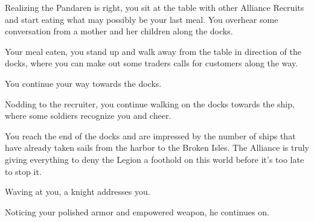 
Realizing the Pandaren is right, you sit at the table with other Alliance Recruits and start eating what may possibly be your last meal. You overhear some conversation from a mother and her children along the docks.





Your meal eaten, you stand up and walk away from the table in direction of the docks, where you can make out some traders calls for customers along the way.



You continue your way towards the docks.


Nodding to the recruiter, you continue walking on the docks towards the ship, where some soldiers recognize you and cheer.



You reach the end of the docks and are impressed by the number of ships that have already taken sails from the harbor to the Broken Isles. The Alliance is truly giving everything to deny the Legion a foothold on this world before it's too late to stop it.

Waving at you, a knight addresses you.


Noticing your polished armor and empowered weapon, he continues on.


